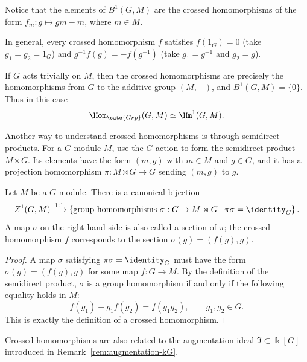 Notice that the elements of $B^1(G,M)$ are the crossed homomorphisms of the
form $f_m:g\mapsto gm-m$, where $m\in M$.

In general, every crossed homomorphism $f$ satisfies $f(1_G)=0$ (take
$g_1=g_2=1_G$) and $g^{-1}f(g)=-f(g^{-1})$ (take $g_1=g^{-1}$ and $g_2=g$).

\begin{example}
	If $G$ acts trivially on $M$, then the crossed homomorphisms are precisely
	the homomorphisms from $G$ to the additive group $(M,+)$, and
	$B^1(G,M)=\{0\}$. Thus in this case
	\[ \Hom_{\cate{Grp}}(G,M)\simeq\Hm^1(G,M). \]
\end{example}

Another way to understand crossed homomorphisms is through semidirect products.
For a $G$-module $M$, use the $G$-action to form the semidirect product
$M\rtimes G$. Its elements have the form $(m,g)$ with $m\in M$ and $g\in G$,
and it has a projection homomorphism $\pi:M\rtimes G\to G$ sending $(m,g)$
to $g$.

\begin{proposition}\label{prop:crossed-semidirect-product}
	Let $M$ be a $G$-module. There is a canonical bijection
	\[ Z^1(G,M)\xrightarrow{1:1}
	\left\{\text{group homomorphisms }\sigma:G\to M\rtimes G
	\;\middle|\;\pi\sigma=\identity_G\right\}. \]
	A map $\sigma$ on the right-hand side is also called a section of $\pi$;
	the crossed homomorphism $f$ corresponds to the section
	$\sigma(g)=(f(g),g)$.
\end{proposition}
\begin{proof}
	A map $\sigma$ satisfying $\pi\sigma=\identity_G$ must have the form
	$\sigma(g)=(f(g),g)$ for some map $f:G\to M$. By the definition of the
	semidirect product, $\sigma$ is a group homomorphism if and only if the
	following equality holds in $M$:
	\[ f(g_1)+g_1f(g_2)=f(g_1g_2),\qquad g_1,g_2\in G. \]
	This is exactly the definition of a crossed homomorphism.
\end{proof}

Crossed homomorphisms are also related to the augmentation ideal
$\mathfrak{I}\subset\Bbbk[G]$ introduced in
Remark~\ref{rem:augmentation-kG}.

